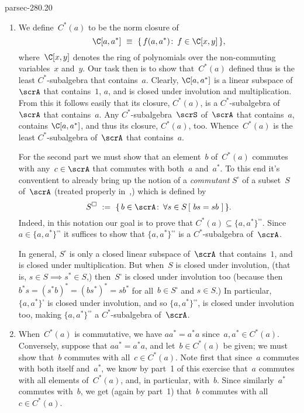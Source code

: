 \documentclass[b5page]{book}
\begin{document}
\begin{solution}{parsec-280.20}
\begin{enumerate}
\item
We define~$C^*(a)$ to be
the norm closure of
\begin{equation*}
\C[a,a^*]\ \equiv\  \{\,f(a,a^*)\colon \,f\in \C[x,y]\,\},
\end{equation*}
where~$\C[x,y]$ denotes the ring
of polynomials over the non-commuting variables~$x$ and~$y$.
Our task then is to show that~$C^*(a)$
defined thus is the least $C^*$-subalgebra
that contains~$a$.
Clearly, $\C[a,a^*]$ is a linear subspace of~$\scrA$
that contains~$1$, $a$, and is
closed under involution and multiplication.
From this it follows easily that its closure, $C^*(a)$,
is a $C^*$-subalgebra of~$\scrA$ that contains~$a$.
Any $C^*$-subalgebra~$\scrS$ of~$\scrA$
that contains~$a$, contains $\C[a,a^*]$, 
and thus its closure, $C^*(a)$, too.
Whence~$C^*(a)$ is the least $C^*$-subalgebra of~$\scrA$ that 
contains~$a$.

For the second part
we must show that an element~$b$ of~$C^*(a)$
commutes with any~$c\in \scrA$
that commutes with both~$a$ and~$a^*$.
To this end it's conventient 
to already bring up the notion
of a \emph{commutant} $S^\square$ of 
a subset~$S$ of~$\scrA$
(treated properly in~,)
which is defined by
\begin{equation*}
S^\square\ := \ \{\,
b\in \scrA\colon\, \forall s\in S\,[\ bs=sb\ ]\,\}.
\end{equation*}
Indeed,
in this notation
our goal is to prove that
$C^*(a)\subseteq \{a,a^*\}^{\square\square}$.
Since $a\in \{a,a^*\}^{\square\square}$
it suffices  to show that $\{a,a^*\}^{\square\square}$
is a $C^*$-subalgebra of~$\scrA$.

In general, $S^\square$ is only a closed linear subspace
of~$\scrA$ that contains~$1$,
and is closed under multiplication.
But when~$S$ is closed under involution,
(that is, $s\in S\implies s^*\in S$,)
then~$S^\square$
is closed under involution too
(because then $b^*s=(s^*b)^*=(bs^*)^*=sb^*$
for all~$b\in S^\square$ and $s\in S$.)
In particular, $\{a,a^*\}^\square$
is closed under involution,
and 
so  $\{a,a^*\}^{\square\square}$,
is closed under involution too,
making $\{a,a^*\}^{\square\square}$ a $C^*$-subalgebra of~$\scrA$.

\item 
When~$C^*(a)$ is commutative,
we have
$aa^*=a^*a$ since~$a,a^*\in C^*(a)$.
Conversely,
suppose that $aa^*=a^*a$,
and let~$b\in C^*(a)$ be given;
we must show that~$b$ commutes with all~$c\in C^*(a)$.
Note first that
since~$a$ commutes with both itself and~$a^*$,
we know by part~1 of this exercise
that~$a$ commutes with all elements of~$C^*(a)$,
and, in particular, with~$b$.
Since similarly~$a^*$ commutes with~$b$,
we get (again by part~1)
that~$b$ commutes with all~$c\in C^*(a)$.


\end{enumerate}
\end{solution}
\end{document}
